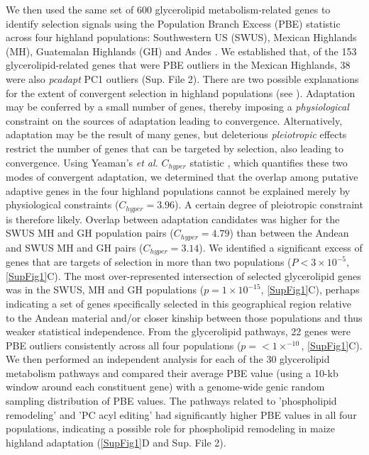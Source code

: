 \documentclass[9pt,twocolumn,twoside,lineno]{biorxiv}
\begin{document}
We then used the same set of 600 glycerolipid metabolism-related genes to identify selection signals using the Population Branch Excess (PBE) \cite{Pool2017-oa} statistic across four highland populations: Southwestern US (SWUS), Mexican Highlands (MH), Guatemalan Highlands (GH) and Andes \cite{Wang2020-mp}.
We established that, of the 153 glycerolipid-related genes that were PBE outliers in the Mexican Highlands, 38 were also \textit{pcadapt} PC1 outliers (Sup. File 2).
There are two possible explanations for the extent of convergent selection in highland populations (see \cite{Wang2020-mp, yeaman2018}). 
Adaptation may be conferred by a small number of genes, thereby imposing a \textit{physiological} constraint on the sources of adaptation leading to convergence. 
Alternatively, adaptation may be the result of many genes, but deleterious \textit{pleiotropic} effects restrict the number of genes that can be targeted by selection, also leading to convergence.  
Using Yeaman's \textit{et al.} $C_{hyper}$ statistic \cite{yeaman2018}, which quantifies these two modes of convergent adaptation, we determined that the overlap among putative adaptive genes in the four highland populations cannot be explained merely by physiological constraints ($C_{hyper} = 3.96$). A certain degree of pleiotropic constraint is therefore likely.
Overlap between adaptation candidates was higher for the SWUS MH and GH population pairs ($C_{hyper} = 4.79$) than between the Andean and SWUS MH and GH pairs ($C_{hyper} = 3.14$).
We identified a significant excess of genes that are targets of selection in more than two populations ($P< 3 \times 10^{-5}$, \ref{SupFig1}C).
The most over-represented intersection of selected glycerolipid genes was in the SWUS, MH and GH populations ($p = 1  \times 10 ^{-15} $, \ref{SupFig1}C), perhaps indicating a set of genes specifically selected in this geographical region relative to the Andean material and/or closer kinship between those populations and thus weaker statistical independence.
From the glycerolipid pathways, 22 genes were PBE outliers consistently across all four populations ($p =<1  \times  ^{-10}$, \ref{SupFig1}C). 
We then performed an independent analysis for each of the 30 glycerolipid metabolism pathways and compared their average PBE value (using a 10-kb window around each constituent gene)  with a genome-wide genic random sampling distribution of PBE values. 
The pathways related to 'phospholipid remodeling'  and 'PC acyl editing' had significantly higher PBE values in all four populations, indicating a possible role for phospholipid remodeling in maize highland adaptation (\ref{SupFig1}D and Sup. File 2). 
\end{document}
